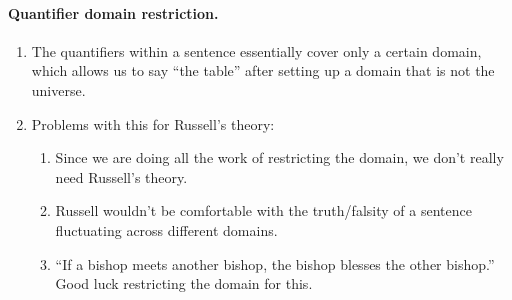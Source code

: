 \paragraph{Quantifier domain restriction.}
\begin{enumerate}
  \item The quantifiers within a sentence essentially cover only a certain domain, which allows us to say ``the table'' after setting up a domain that is not the universe.
  \item Problems with this for Russell's theory:
  \begin{enumerate}[label=(\alph*)]
    \item Since we are doing all the work of restricting the domain, we don't really need Russell's theory.
    \item Russell wouldn't be comfortable with the truth/falsity of a sentence fluctuating across different domains.
    \item ``If a bishop meets another bishop, the bishop blesses the other bishop.'' Good luck restricting the domain for this.
  \end{enumerate}
\end{enumerate}
